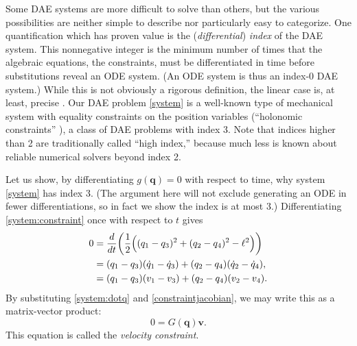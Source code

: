 \documentclass[letterpaper,final,12pt,reqno]{amsart}
\newcommand{\bq}{\mathbf{q}}
\newcommand{\bv}{\mathbf{v}}
\begin{document}
Some DAE systems are more difficult to solve than others, but the various possibilities are neither simple to describe nor particularly easy to categorize.  One quantification which has proven value is the (\emph{differential}) \emph{index} of the DAE system.  This nonnegative integer is the minimum number of times that the algebraic equations, the constraints, must be differentiated in time before substitutions reveal an ODE system.  (An ODE system is thus an index-0 DAE system.)  While this is not obviously a rigorous definition, the linear case is, at least, precise \cite[Chapter IV.5]{HairerWanner1996}.  Our DAE problem \eqref{system} is a well-known type of mechanical system with equality constraints on the position variables (``holonomic constraints'' \cite{Lanczos1970}), a class of DAE problems with index 3.  Note that indices higher than 2 are traditionally called ``high index,'' because much less is known about reliable numerical solvers beyond index 2.

Let us show, by differentiating $g(\bq)=0$ with respect to time, why system \eqref{system} has index 3.  (The argument here will not exclude generating an ODE in fewer differentiations, so in fact we show the index is at most 3.)  Differentiating \eqref{system:constraint} once with respect to $t$ gives
\begin{align}
0 &= \frac{d}{dt} \bigg(\frac{1}{2} \Big((q_1 - q_3)^2 + (q_2 - q_4)^2 - \ell^2\Big)\bigg) \notag \\
  &= (q_1 - q_3)(\dot q_1 - \dot q_3) + (q_2 - q_4) (\dot q_2 - \dot q_4), \notag \\
  &= (q_1 - q_3)(v_1 - v_3) + (q_2 - q_4) (v_2 - v_4). \label{rawvelocityconstraint}
\end{align}
By substituting \eqref{system:dotq} and \eqref{constraintjacobian}, we may write this as a matrix-vector product:
\begin{equation}
0 = G(\bq) \bv. \label{velocityconstraint}
\end{equation}
This equation is called the \emph{velocity constraint}.
\end{document}
